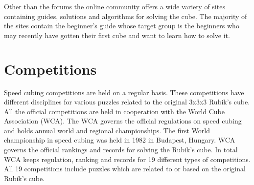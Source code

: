 Other than the forums the online community offers a wide variety of sites containing guides, solutions and algorithms for solving the cube. The majority of the \rubik{} sites contain the beginner's guide\cite{jasminLee08} whose target group is the beginners who may recently have gotten their first cube and want to learn how to solve it. 

\section{Competitions}
\label{sec:wca}
Speed cubing competitions are held on a regular basis\cite{wca/competitions}. These competitions have different disciplines for various puzzles related to the original 3x3x3 Rubik's cube. All the official competitions are held in cooperation with the World Cube Association (WCA). The WCA governs the official regulations on speed cubing and holds annual world and regional championships. The first World championship in speed cubing was held in 1982 in Budapest, Hungary. WCA governs the official rankings and records for solving the Rubik's cube. In total WCA keeps regulation, ranking and records for 19 different types of competitions. All 19 competitions include puzzles which are related to or based on the original Rubik's cube. 
%